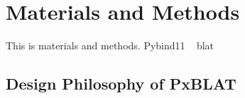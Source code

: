 \section*{Materials and Methods}\label{sec:materials-and-methods}

This is materials and methods.
Pybind11 ~\citep{pybind11}
blat ~\citep{kent2002blat}

\subsection*{Design Philosophy of PxBLAT}\label{ssec:design-philosophy-of-pxblat}










